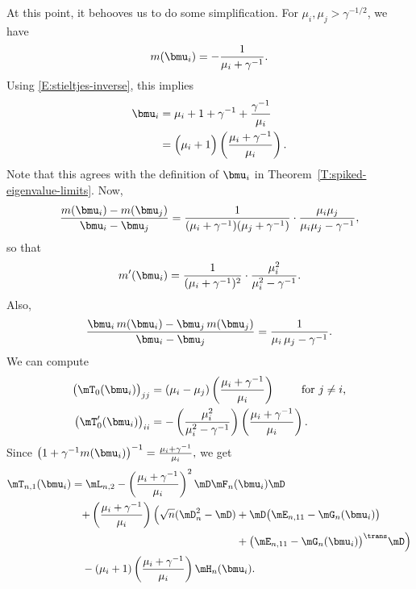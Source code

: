 At this point, it behooves us to do some simplification.  For $\mu_i, \mu_j > \gamma^{-1/2}$, we have
\[
    m(\bmu_i) = - \frac{1}{\mu_i + \gamma^{-1}}.
\]
Using \eqref{E:stieltjes-inverse}, this implies
\begin{align*}
    \bmu_i
        &= \mu_i + 1 + \gamma^{-1} + \frac{ \gamma^{-1} }{ \mu_i } \\
        &= \Big( \mu_i + 1 \Big)
           \left( \frac{ \mu_i + \gamma^{-1} }{ \mu_i } \right).
\end{align*}
Note that this agrees with the definition of $\bmu_i$ in Theorem~\ref{T:spiked-eigenvalue-limits}.  Now,
\[
    \frac{ m(\bmu_i) - m(\bmu_j) }
         { \bmu_i - \bmu_j }
    =
    \frac{1}{ ( \mu_i + \gamma^{-1} ) ( \mu_j + \gamma^{-1} ) }
    \cdot
    \frac{ \mu_i \mu_j }{ \mu_i \mu_j - \gamma^{-1} },
\]
so that
\[
    m'(\bmu_i)
    =
    \frac{ 1 }{ ( \mu_i + \gamma^{-1} )^2 }
    \cdot
    \frac{ \mu_i^2 }{ \mu_i^2 - \gamma^{-1} }.
\]
Also,
\[
    \frac{ \bmu_i \, m( \bmu_i ) - \bmu_j \, m( \bmu_j ) }
         { \bmu_i - \bmu_j }
        =
            \frac{1}{\mu_i \, \mu_j - \gamma^{-1}}.
\]
We can compute
\begin{align*}
    \big( \mT_0(\bmu_i) \big)_{jj}
        &=
            ( \mu_i - \mu_j )
            \left( \frac{ \mu_i + \gamma^{-1} }{ \mu_i } \right) 
                \qquad\text{ for $j \neq i$,} \\
    \big( \mT_0'(\bmu_i) \big)_{ii}
        &=
            -
            \left(
                \frac{ \mu_i^2 }{ \mu_i^2 - \gamma^{-1} }
            \right)
            \left(
                \frac{\mu_i + \gamma^{-1}}{ \mu_i }
            \right).
\end{align*}
Since
\(
    \big( 1 + \gamma^{-1} m( \bmu_i ) \big)^{-1}
        = \frac{ \mu_i + \gamma^{-1} }{ \mu_i },
\)
we get
\[
    \begin{split}
        \mT_{n,1}(\bmu_i)
           &=
                \mL_{n,2}
                -
                \left(
                    \frac{\mu_i + \gamma^{-1}}{\mu_i}
                \right)^2
                \mD \mF_n (\bmu_i ) \mD \\
            &
                \begin{split}
                \quad+
                \left(
                    \frac{\mu_i + \gamma^{-1}}{\mu_i}
                \right)
                \Big(
                    \sqrt{n} ( \mD_n^2 - \mD )
                    &+
                    \mD
                    \big( \mE_{n,11} - \mG_{n} (\bmu_i) \big) \\
                    &+
                    \big( \mE_{n,11} - \mG_{n} (\bmu_i) \big)^\trans                    
                    \mD
                \Big) 
                \end{split}\\
            &\quad-
                (\mu_i + 1)
                \left(
                    \frac{\mu_i + \gamma^{-1}}{\mu_i}
                \right)
                \mH_n(\bmu_i).
    \end{split}
\]
